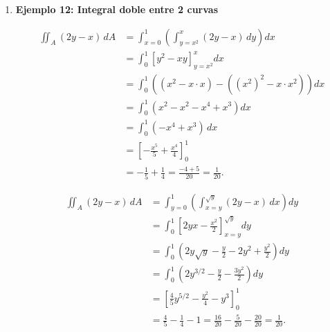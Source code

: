 \documentclass[11pt]{book}
\theoremstyle{definicion}
\theoremstyle{teorema}
\theoremstyle{ejemplo}
\begin{document}
\begin{enumerate}
\[
\begin{aligned}
\iint_A 2xy \, dA &= \int_{y=0}^{2} \left( \int_{x=0}^{1 - \frac{y}{2}} 2xy \, dx \right) dy \\
&= \int_{0}^{2} y \left( \int_{0}^{1 - \frac{y}{2}} 2x \, dx \right) dy \\
&= \int_{0}^{2} y \left[ x^2 \right]_{0}^{1 - \frac{y}{2}} dy \\
&= \int_{0}^{2} y \left(1 - \frac{y}{2}\right)^2 dy \\
&= \int_{0}^{2} y \left(1 - y + \frac{y^2}{4}\right) dy \\
&= \int_{0}^{2} \left(y - y^2 + \frac{y^3}{4}\right) dy \\
&= \left[ \frac{y^2}{2} - \frac{y^3}{3} + \frac{y^4}{16} \right]_{0}^{2} \\
&= \left( \frac{4}{2} - \frac{8}{3} + \frac{16}{16} \right) - 0 \\
&= 2 - \frac{8}{3} + 1 = \boxed{\frac{1}{2}}.
\end{aligned}
\]

\item \textbf{Ejemplo 12: Integral doble entre 2 curvas}

\[
\begin{aligned}
\iint_A (2y - x) \, dA &= \int_{x=0}^{1} \left( \int_{y=x^2}^{x} (2y - x) \, dy \right) dx \\
&= \int_{0}^{1} \left[ y^2 - xy \right]_{y=x^2}^{x} dx \\
&= \int_{0}^{1} \left( (x^2 - x \cdot x) - ((x^2)^2 - x \cdot x^2) \right) dx \\
&= \int_{0}^{1} \left( x^2 - x^2 - x^4 + x^3 \right) dx \\
&= \int_{0}^{1} (-x^4 + x^3) \, dx \\
&= \left[ -\frac{x^5}{5} + \frac{x^4}{4} \right]_{0}^{1} \\
&= -\frac{1}{5} + \frac{1}{4} = \frac{-4 + 5}{20} = \boxed{\frac{1}{20}}.
\end{aligned}
\]

\[
\begin{aligned}
\iint_A (2y - x) \, dA &= \int_{y=0}^{1} \left( \int_{x=y}^{\sqrt{y}} (2y - x) \, dx \right) dy \\
&= \int_{0}^{1} \left[ 2y x - \frac{x^2}{2} \right]_{x=y}^{\sqrt{y}} dy \\
&= \int_{0}^{1} \left( 2y \sqrt{y} - \frac{y}{2} - 2y^2 + \frac{y^2}{2} \right) dy \\
&= \int_{0}^{1} \left( 2y^{3/2} - \frac{y}{2} - \frac{3y^2}{2} \right) dy \\
&= \left[ \frac{4}{5} y^{5/2} - \frac{y^2}{4} - y^3 \right]_{0}^{1} \\
&= \frac{4}{5} - \frac{1}{4} - 1 = \frac{16}{20} - \frac{5}{20} - \frac{20}{20} = \boxed{\frac{1}{20}}.
\end{aligned}
\]


\end{enumerate}
\end{document}

